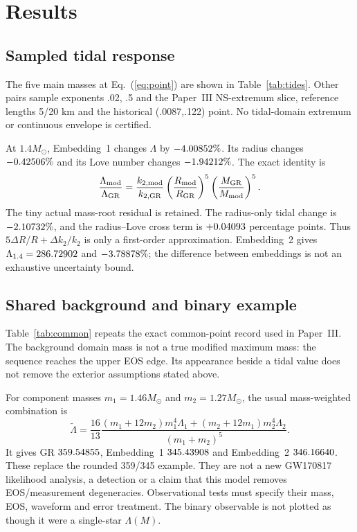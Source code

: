 \documentclass[twocolumn,prd,superscriptaddress,nofootinbib]{revtex4-2}
\begin{document}
\section{Results}
\subsection{Sampled tidal response}
The five main masses at Eq.~(\ref{eq:point}) are shown in
Table~\ref{tab:tides}. Other pairs sample exponents .02, .5 and the
Paper~III NS-extremum slice, reference lengths 5/20 km and the historical
(.0087,.122) point. No tidal-domain extremum or continuous envelope is
certified.




At $1.4M_\odot$, Embedding~1 changes $\Lambda$ by
$-4.00852\%$. Its radius changes $-0.42506\%$ and
its Love number changes $-1.94212\%$. The exact identity is
\begin{equation}
 \frac{\Lambda_{\rm mod}}{\Lambda_{\rm GR}}=
 \frac{k_{2,\rm mod}}{k_{2,\rm GR}}
 \left(\frac{R_{\rm mod}}{R_{\rm GR}}\right)^5
 \left(\frac{M_{\rm GR}}{M_{\rm mod}}\right)^5.
\end{equation}
The tiny actual mass-root residual is retained. The radius-only tidal
change is $-2.10732\%$, and the radius--Love cross term is
$+0.04093$ percentage points. Thus $5\Delta R/R+\Delta k_2/k_2$
is only a first-order approximation. Embedding~2 gives
$\Lambda_{1.4}=286.72902$ and $-3.78878\%$; the difference
between embeddings is not an exhaustive uncertainty bound.

\subsection{Shared background and binary example}
Table~\ref{tab:common} repeats the exact common-point record used in
Paper~III. The background domain mass is not a true modified maximum mass:
the sequence reaches the upper EOS edge. Its appearance beside a tidal
value does not remove the exterior assumptions stated above.


For component masses $m_1=1.46M_\odot$ and $m_2=1.27M_\odot$, the usual
mass-weighted combination \cite{Flanagan2008} is
\begin{equation}
 \widetilde\Lambda=\frac{16}{13}
 \frac{(m_1+12m_2)m_1^4\Lambda_1+(m_2+12m_1)m_2^4\Lambda_2}
 {(m_1+m_2)^5}.
\end{equation}
It gives GR $359.54855$, Embedding~1 $345.43908$ and
Embedding~2 $346.16640$. These replace the rounded 359/345 example.
They are not a new GW170817 likelihood analysis, a detection or a claim
that this model removes EOS/measurement degeneracies. Observational tests
must specify their mass, EOS, waveform and error treatment. The binary
observable is not plotted as though it were a single-star $\Lambda(M)$.
\end{document}

